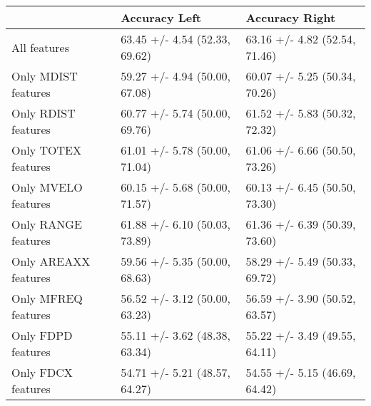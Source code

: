 \begin{tabular}{lll}
\toprule
{} &                  Accuracy Left &                 Accuracy Right \\
\midrule
All features         &  63.45 +/- 4.54 (52.33, 69.62) &  63.16 +/- 4.82 (52.54, 71.46) \\
Only MDIST features  &  59.27 +/- 4.94 (50.00, 67.08) &  60.07 +/- 5.25 (50.34, 70.26) \\
Only RDIST features  &  60.77 +/- 5.74 (50.00, 69.76) &  61.52 +/- 5.83 (50.32, 72.32) \\
Only TOTEX features  &  61.01 +/- 5.78 (50.00, 71.04) &  61.06 +/- 6.66 (50.50, 73.26) \\
Only MVELO features  &  60.15 +/- 5.68 (50.00, 71.57) &  60.13 +/- 6.45 (50.50, 73.30) \\
Only RANGE features  &  61.88 +/- 6.10 (50.03, 73.89) &  61.36 +/- 6.39 (50.39, 73.60) \\
Only AREAXX features &  59.56 +/- 5.35 (50.00, 68.63) &  58.29 +/- 5.49 (50.33, 69.72) \\
Only MFREQ features  &  56.52 +/- 3.12 (50.00, 63.23) &  56.59 +/- 3.90 (50.52, 63.57) \\
Only FDPD features   &  55.11 +/- 3.62 (48.38, 63.34) &  55.22 +/- 3.49 (49.55, 64.11) \\
Only FDCX features   &  54.71 +/- 5.21 (48.57, 64.27) &  54.55 +/- 5.15 (46.69, 64.42) \\
\bottomrule
\end{tabular}

